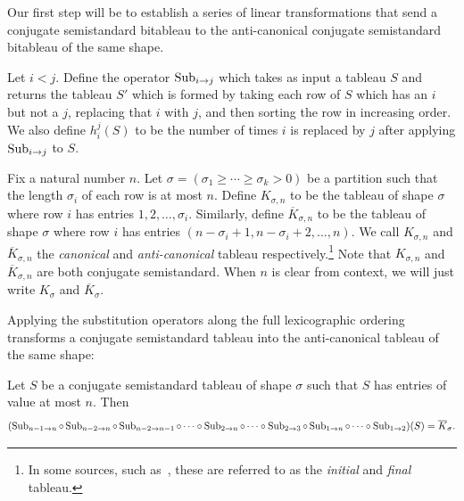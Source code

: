 \documentclass[letterpaper, 11pt]{amsart}
\newif\iffull
\begin{document}
Our first step will be to establish a series of linear transformations that send a conjugate semistandard bitableau to the anti-canonical conjugate semistandard bitableau of the same shape.
\begin{defn}\label{defn:sub}
  Let $i < j$.
  Define the operator $\operatorname{Sub}_{i \to j}$ which takes as input a tableau $S$ and returns the tableau $S'$ which is formed by taking each row of $S$ which has an $i$ but not a $j$, replacing that $i$ with $j$, and then sorting the row in increasing order.
  We also define $h_{i}^{j}(S)$ to be the number of times $i$ is replaced by $j$ after applying $\operatorname{Sub}_{i \to j}$ to $S$.
\end{defn}

\iffull
\clearpage
\fi

\begin{defn}\label{defn:canonical_tableau}
  Fix a natural number $n$.
  Let $\sigma = (\sigma_1 \geq \cdots \geq \sigma_k > 0)$ be a partition such that the length $\sigma_i$ of each row is at most $n$.
  Define $K_{\sigma, n}$ to be the tableau of shape $\sigma$ where row $i$ has entries $1, 2, \ldots, \sigma_i$.
  Similarly, define $\overline{K}_{\sigma, n}$ to be the tableau of shape $\sigma$ where row $i$ has entries $(n - \sigma_i + 1, n - \sigma_i + 2, \ldots, n)$.
  We call $K_{\sigma, n}$ and $\overline{K}_{\sigma, n}$ the \emph{canonical} and \emph{anti-canonical} tableau respectively.\footnote{In some sources, such as~\cite{BV88}, these are referred to as the \emph{initial} and \emph{final} tableau.}
  Note that $K_{\sigma, n}$ and $\overline{K}_{\sigma, n}$ are both conjugate semistandard.
  When $n$ is clear from context, we will just write $K_{\sigma}$ and $\overline{K}_{\sigma}$.
\end{defn}

\iffull
\begin{ex}
  If $\sigma = (5, 4, 2, 1)$ and $n = 7$, then $K_\sigma$ and $\overline{K}_\sigma$ are given in \Cref{fig:canonical_tableau_ex}.

  \begin{figure}[H]
      \centering
      \[
          \young(12345,1234,12,1) \qquad \young(34567,4567,67,7)
      \]
      \caption{
        The canonical and anti-canonical tableau for $\sigma = (5, 4, 2, 1)$ and $n = 7$.
      }\label{fig:canonical_tableau_ex}
  \end{figure}
\end{ex}
\fi

Applying the substitution operators along the full lexicographic ordering transforms a conjugate semistandard tableau into the anti-canonical tableau of the same shape:
\begin{lem}\label{lem:sub_anticanonical}
  Let $S$ be a conjugate semistandard tableau of shape $\sigma$ such that $S$ has entries of value at most $n$.
  Then
  \[
    (\operatorname{Sub}_{n - 1 \to n} \circ \operatorname{Sub}_{n - 2 \to n} \circ  \operatorname{Sub}_{n - 2 \to n-1} \circ \cdots \circ \operatorname{Sub}_{2 \to n}\circ\cdots\circ\operatorname{Sub}_{2 \to 3} \circ \operatorname{Sub}_{1 \to n} \circ \cdots \circ \operatorname{Sub}_{1 \to 2})(S) = \overline{K}_\sigma.
  \]
\end{lem}
\end{document}
